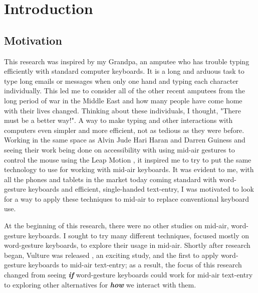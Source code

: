 \chapter{Introduction}

\section{Motivation}
This research was inspired by my Grandpa, an amputee who has trouble typing efficiently with standard computer keyboards. It is a long and arduous task to type long emails or messages when only one hand and typing each character individually. This led me to consider all of the other recent amputees from the long period of war in the Middle East and how many people have come home with their lives changed. Thinking about these individuals, I thought, "There must be a better way!". A way to make typing and other interactions with computers even simpler and more efficient, not as tedious as they were before. Working in the same space as Alvin Jude Hari Haran and Darren Guiness and seeing their work being done on accessibility with using mid-air gestures to control the mouse using the Leap Motion \cite{ref_leap_motion,ref_alvin_thesis,ref_darren_thesis}, it inspired me to try to put the same technology to use for working with mid-air keyboards. It was evident to me, with all the phones and tablets in the market today coming standard with word-gesture keyboards and efficient, single-handed text-entry, I was motivated to look for a way to apply these techniques to mid-air to replace conventional keyboard use.

At the beginning of this research, there were no other studies on mid-air, word-gesture keyboards. I sought to try many different techniques, focused mostly on word-gesture keyboards, to explore their usage in mid-air. Shortly after research began, Vulture was released \cite{ref_vulture}, an exciting study, and the first to apply word-gesture keyboards to mid-air text-entry; as a result, the focus of this research changed from seeing \textbf{\textit{if}} word-gesture keyboards could work for mid-air text-entry to exploring other alternatives for \textbf{\textit{how}} we interact with them.

